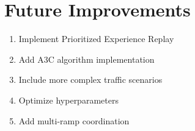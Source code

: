 \documentclass[a4paper, 12pt]{article}
\begin{document}
\section{Future Improvements}
\begin{enumerate}
    \item Implement Prioritized Experience Replay
    \item Add A3C algorithm implementation
    \item Include more complex traffic scenarios
    \item Optimize hyperparameters
    \item Add multi-ramp coordination
\end{enumerate}
\end{document}
